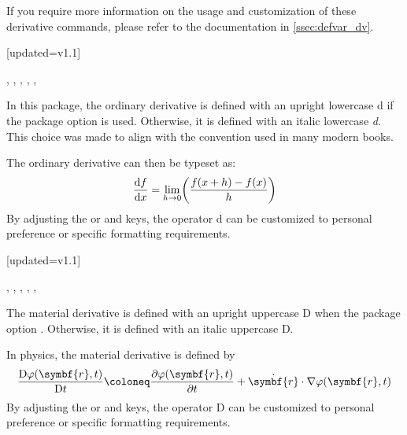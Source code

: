 If you require more information on the usage and customization of these derivative commands, please refer to the documentation in \cref{ssec:defvar_dv}.

\begin{function}{\odv}[updated=v1.1]
	\begin{syntax}
		\sarg, , , \targ{/}, , 
	\end{syntax}
	In this package, the ordinary derivative is defined with an upright lowercase d if the package option  is used. Otherwise, it is defined with an italic lowercase \textit{d}. This choice was made to align with the convention used in many modern books.
	\begin{definition}
	\end{definition}

	\noindent The ordinary derivative can then be typeset as:
	\begin{equation*}
		\odv{f}{x} = \lim_{h\to 0} \mleft( \frac{ f(x+h) - f(x) }{ h } \mright)
	\end{equation*}
	By adjusting the  or  and  keys, the operator d can be customized to personal preference or specific formatting requirements.
\end{function}

\begin{function}{\mdv}[updated=v1.1]
	\begin{syntax}
		\sarg, , , \targ{/}, , \earg{\_, point\tsb{1}, \^, point\tsb{2}}
	\end{syntax}
	The material derivative is defined with an upright uppercase D when the package option . Otherwise, it is defined with an italic uppercase D.
	\begin{definition}
	\end{definition}
	
	\noindent In physics, the material derivative is defined by
	\begin{equation*}
		\mdv{ \varphi(\symbf{r}, t) }{ t } \coloneq \pdv{ \varphi(\symbf{r}, t) }{ t } + \dot{\symbf{r}} \cdot \nabla \varphi(\symbf{r}, t)
	\end{equation*}
	By adjusting the  or  and  keys, the operator D can be customized to personal preference or specific formatting requirements.
\end{function}

